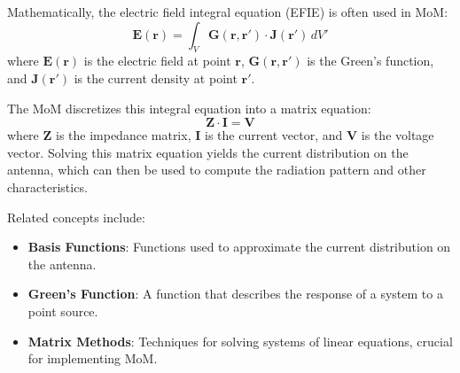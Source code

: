 Mathematically, the electric field integral equation (EFIE) is often used in MoM:
\[
\mathbf{E}(\mathbf{r}) = \int_V \mathbf{G}(\mathbf{r}, \mathbf{r}') \cdot \mathbf{J}(\mathbf{r}') \, dV'
\]
where \(\mathbf{E}(\mathbf{r})\) is the electric field at point \(\mathbf{r}\), \(\mathbf{G}(\mathbf{r}, \mathbf{r}')\) is the Green's function, and \(\mathbf{J}(\mathbf{r}')\) is the current density at point \(\mathbf{r}'\).

The MoM discretizes this integral equation into a matrix equation:
\[
\mathbf{Z} \cdot \mathbf{I} = \mathbf{V}
\]
where \(\mathbf{Z}\) is the impedance matrix, \(\mathbf{I}\) is the current vector, and \(\mathbf{V}\) is the voltage vector. Solving this matrix equation yields the current distribution on the antenna, which can then be used to compute the radiation pattern and other characteristics.

Related concepts include:
\begin{itemize}
    \item \textbf{Basis Functions}: Functions used to approximate the current distribution on the antenna.
    \item \textbf{Green's Function}: A function that describes the response of a system to a point source.
    \item \textbf{Matrix Methods}: Techniques for solving systems of linear equations, crucial for implementing MoM.
\end{itemize}

